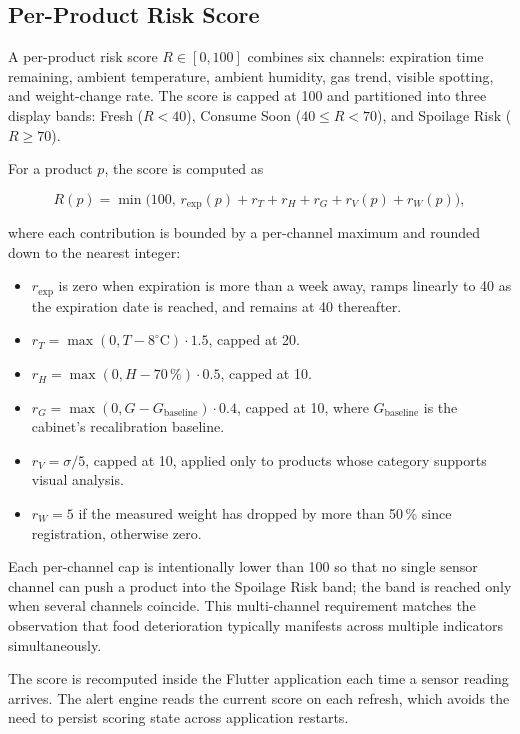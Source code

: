 \subsection{Per-Product Risk Score}
\label{sec:algo-risk}

A per-product risk score $R \in [0, 100]$ combines six channels:
expiration time remaining, ambient temperature, ambient humidity,
gas trend, visible spotting, and weight-change rate. The score is
capped at 100 and partitioned into three display bands: Fresh
($R < 40$), Consume Soon ($40 \leq R < 70$), and Spoilage Risk
($R \geq 70$).

For a product $p$, the score is computed as

\begin{equation}
R(p) = \min\!\bigl(100,\, r_{\text{exp}}(p) + r_T + r_H + r_G + r_V(p) + r_W(p)\bigr),
\label{eq:risk}
\end{equation}

where each contribution is bounded by a per-channel maximum and
rounded down to the nearest integer:

\begin{itemize}
  \item $r_{\text{exp}}$ is zero when expiration is more than a week
        away, ramps linearly to 40 as the expiration date is reached,
        and remains at 40 thereafter.
  \item $r_T = \max(0, T - 8^\circ\mathrm{C}) \cdot 1.5$, capped at 20.
  \item $r_H = \max(0, H - 70\,\%) \cdot 0.5$, capped at 10.
  \item $r_G = \max(0, G - G_{\text{baseline}}) \cdot 0.4$, capped at 10,
        where $G_{\text{baseline}}$ is the cabinet's recalibration
        baseline.
  \item $r_V = \sigma / 5$, capped at 10, applied only to products
        whose category supports visual analysis.
  \item $r_W = 5$ if the measured weight has dropped by more than
        50\,\% since registration, otherwise zero.
\end{itemize}

Each per-channel cap is intentionally lower than 100 so that no
single sensor channel can push a product into the Spoilage Risk
band; the band is reached only when several channels coincide. This
multi-channel requirement matches the observation that food
deterioration typically manifests across multiple indicators
simultaneously.

The score is recomputed inside the Flutter application each time a
sensor reading arrives. The alert engine reads the current score on
each refresh, which avoids the need to persist scoring state across
application restarts.
